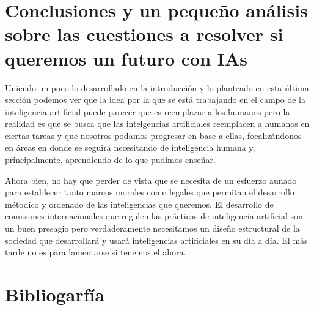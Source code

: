 \documentclass[11pt]{article}
\begin{document}
\section{Conclusiones y un pequeño análisis sobre las cuestiones a resolver si queremos un futuro con IAs}
Uniendo un poco lo desarrollado en la introducción y
lo planteado en esta última sección podemos ver que la 
idea por la que se está trabajando en el campo de la 
inteligencia artificial puede parecer que es 
reemplazar a los humanos pero la realidad es que se busca
que las intelgencias artificiales reemplacen a humanos en 
ciertas tareas y que nosotros podamos progresar en base a 
ellas, focalizándonos en áreas en donde se seguirá 
necesitando de inteligencia humana y, principalmente, 
aprendiendo de lo que pudimos enseñar.

Ahora bien, no hay que perder de vista que se necesita 
de un esfuerzo aunado para establecer
tanto marcos morales como legales que permitan el desarrollo 
métodico y ordenado
de las inteligencias que queremos. El desarrollo de 
comisiones internacionales que regulen las 
prácticas de inteligencia artificial son un buen presagio 
pero verdaderamente necesitamos un diseño estructural 
de la sociedad que desarrollará y usará inteligencias 
artificiales en su día a día. El más tarde no es
para lamentarse si tenemos el ahora.





\section{Bibliogarfía}
\end{document}
